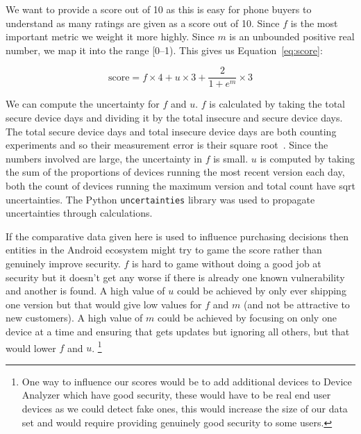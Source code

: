 We want to provide a score out of 10 as this is easy for phone buyers to understand as many ratings are given as a score out of 10.
Since $f$ is the most important metric we weight it more highly.
Since $m$ is an unbounded positive real number, we map it into the range [0--1).
This gives us Equation~\ref{eq:score}:

\begin{equation}
\mathrm{score} = f\times 4 + u \times 3 + \frac{2}{1+e^m} \times 3 \label{eq:score}
\end{equation}

We can compute the uncertainty for $f$ and $u$.
$f$ is calculated by taking the total secure device days and dividing it by the total insecure and secure device days.
The total secure device days and total insecure device days are both counting experiments and so their measurement error is their square root~\cite{Taylor1997}.
Since the numbers involved are large, the uncertainty in $f$ is small.
$u$ is computed by taking the sum of the proportions of devices running the most recent version each day, both the count of devices running the maximum version and total count have sqrt uncertainties.
The Python \texttt{uncertainties} library was used to propagate uncertainties through calculations.


If the comparative data given here is used to influence purchasing decisions then entities in the Android ecosystem might try to game the score rather than genuinely improve security.
$f$ is hard to game without doing a good job at security but it doesn't get any worse if there is already one known vulnerability and another is found.
A high value of $u$ could be achieved by only ever shipping one version but that would give low values for $f$ and $m$ (and not be attractive to new customers).
A high value of $m$ could be achieved by focusing on only one device at a time and ensuring that gets updates but ignoring all others, but that would lower $f$ and $u$.
\footnote{One way to influence our scores would be to add additional devices to Device Analyzer which have good security, these would have to be real end user devices as we could detect fake ones, this would increase the size of our data set and would require providing genuinely good security to some users.}

